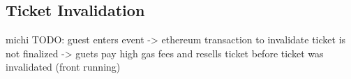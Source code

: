 \subsection{Ticket Invalidation}\label{subsection:ticket-invalidation}
michi
TODO: guest enters event -> ethereum transaction to invalidate ticket is not finalized -> guets pay high gas fees and resells ticket before ticket was invalidated (front running)